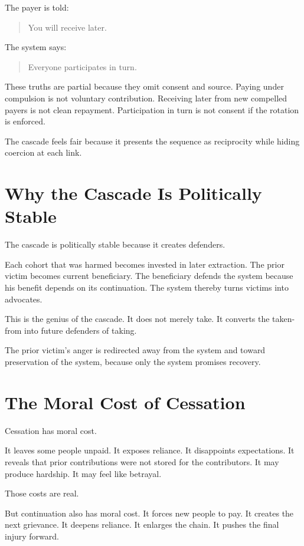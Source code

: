 \documentclass[12pt]{article}
\begin{document}
The payer is told:

\begin{quote}
You will receive later.
\end{quote}

The system says:

\begin{quote}
Everyone participates in turn.
\end{quote}

These truths are partial because they omit consent and source. Paying under compulsion is not voluntary contribution. Receiving later from new compelled payers is not clean repayment. Participation in turn is not consent if the rotation is enforced.

The cascade feels fair because it presents the sequence as reciprocity while hiding coercion at each link.

\section{Why the Cascade Is Politically Stable}

The cascade is politically stable because it creates defenders.

Each cohort that was harmed becomes invested in later extraction. The prior victim becomes current beneficiary. The beneficiary defends the system because his benefit depends on its continuation. The system thereby turns victims into advocates.

This is the genius of the cascade. It does not merely take. It converts the taken-from into future defenders of taking.

The prior victim's anger is redirected away from the system and toward preservation of the system, because only the system promises recovery.

\section{The Moral Cost of Cessation}

Cessation has moral cost.

It leaves some people unpaid. It exposes reliance. It disappoints expectations. It reveals that prior contributions were not stored for the contributors. It may produce hardship. It may feel like betrayal.

Those costs are real.

But continuation also has moral cost. It forces new people to pay. It creates the next grievance. It deepens reliance. It enlarges the chain. It pushes the final injury forward.
\end{document}

